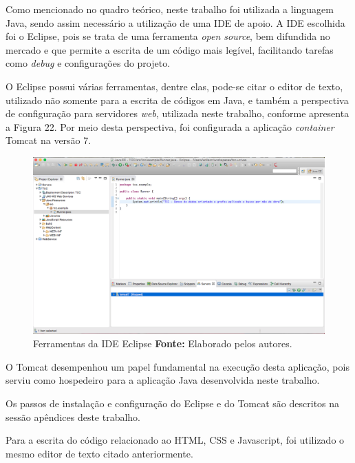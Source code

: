 \par Como mencionado no quadro teórico, neste trabalho foi utilizada a linguagem Java, sendo assim necessário a utilização de uma IDE de apoio. A IDE escolhida foi o Eclipse, pois se trata de uma ferramenta \textit{open source}, bem difundida no mercado e que permite a escrita de um código mais legível, facilitando tarefas como \textit{debug} e configurações do projeto.

\par O Eclipse possui várias ferramentas, dentre elas, pode-se citar o editor de texto, utilizado não somente para a escrita de códigos em Java, e também a perspectiva de configuração para servidores \textit{web}, utilizada neste trabalho, conforme apresenta a Figura 22. Por meio desta perspectiva, foi configurada a aplicação \textit{container} Tomcat na versão 7.

\newpage
\begin{figure}[h!]
	\centerline{\includegraphics[scale=0.35]{./imagens/eclipse-editor-texto.png}}
	\caption[Ferramentas da IDE Eclipse]
	{Ferramentas da IDE Eclipse \textbf{Fonte:} Elaborado pelos autores.}
	\label{fig:exemplo1}
\end{figure}

\par O Tomcat desempenhou um papel fundamental na execução desta aplicação, pois serviu como hospedeiro para a aplicação Java desenvolvida neste trabalho. 

\par Os passos de instalação e configuração do Eclipse e do Tomcat são descritos na sessão apêndices deste trabalho.

\par Para a escrita do código relacionado ao HTML, CSS e Javascript, foi utilizado o mesmo editor de texto citado anteriormente.


